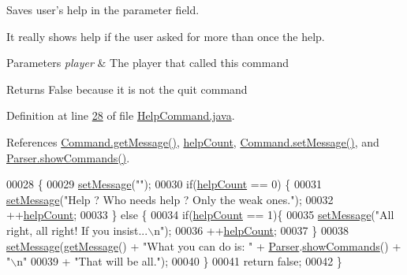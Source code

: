 Saves user's help in the parameter field. 

It really shows help if the user asked for more than once the help. 
\begin{DoxyParams}{Parameters}
{\em player} & The player that called this command \\
\hline
\end{DoxyParams}
\begin{DoxyReturn}{Returns}
False because it is not the quit command 
\end{DoxyReturn}


Definition at line \hyperlink{HelpCommand_8java_source_l00028}{28} of file \hyperlink{HelpCommand_8java_source}{Help\-Command.\-java}.



References \hyperlink{Command_8java_source_l00057}{Command.\-get\-Message()}, \hyperlink{HelpCommand_8java_source_l00013}{help\-Count}, \hyperlink{Command_8java_source_l00049}{Command.\-set\-Message()}, and \hyperlink{Parser_8java_source_l00047}{Parser.\-show\-Commands()}.


\begin{DoxyCode}
00028                                           \{
00029         \hyperlink{classCommand_a715709d8f0ab65879d79ad1725c96f17}{setMessage}(\textcolor{stringliteral}{""});
00030         \textcolor{keywordflow}{if}(\hyperlink{classHelpCommand_a43be62a6791ea374e55433d33447124d}{helpCount} == 0) \{
00031             \hyperlink{classCommand_a715709d8f0ab65879d79ad1725c96f17}{setMessage}(\textcolor{stringliteral}{"Help ? Who needs help ? Only the weak ones."});
00032             ++\hyperlink{classHelpCommand_a43be62a6791ea374e55433d33447124d}{helpCount};
00033         \} \textcolor{keywordflow}{else} \{
00034             \textcolor{keywordflow}{if}(\hyperlink{classHelpCommand_a43be62a6791ea374e55433d33447124d}{helpCount} == 1)\{
00035                 \hyperlink{classCommand_a715709d8f0ab65879d79ad1725c96f17}{setMessage}(\textcolor{stringliteral}{"All right, all right! If you insist...\(\backslash\)n"});
00036                 ++\hyperlink{classHelpCommand_a43be62a6791ea374e55433d33447124d}{helpCount};
00037             \}
00038             \hyperlink{classCommand_a715709d8f0ab65879d79ad1725c96f17}{setMessage}(\hyperlink{classCommand_ac3d4abebefb2aea0ce9757bf9c356882}{getMessage}() + \textcolor{stringliteral}{"What you can do is: "} + 
      \hyperlink{classParser}{Parser}.\hyperlink{classParser_a2510fee1c8d7298e222edaf1f34660dc}{showCommands}() + \textcolor{stringliteral}{"\(\backslash\)n"}
00039                     + \textcolor{stringliteral}{"That will be all."});
00040         \}
00041         \textcolor{keywordflow}{return} \textcolor{keyword}{false};
00042     \}
\end{DoxyCode}


